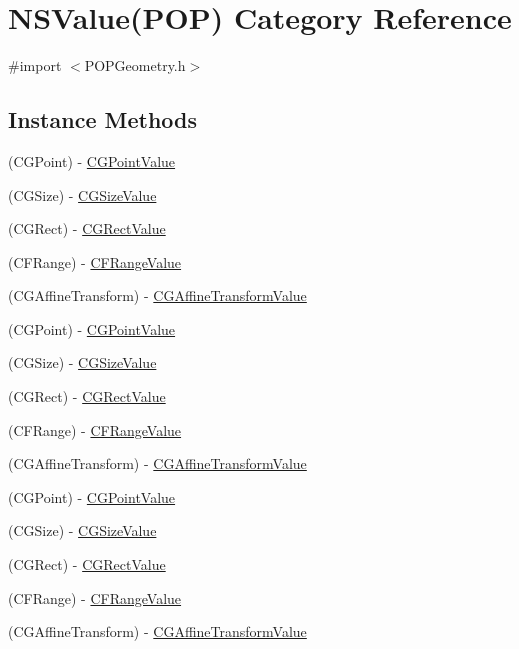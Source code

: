 \hypertarget{category_n_s_value_07_p_o_p_08}{}\section{N\+S\+Value(P\+OP) Category Reference}
\label{category_n_s_value_07_p_o_p_08}


{\ttfamily \#import $<$P\+O\+P\+Geometry.\+h$>$}

\subsection*{Instance Methods}
\begin{DoxyCompactItemize}
\item 
(C\+G\+Point) -\/ \mbox{\hyperlink{category_n_s_value_07_p_o_p_08_a822d03e52b5732d4f1f1e113ee98eae1}{C\+G\+Point\+Value}}
\item 
(C\+G\+Size) -\/ \mbox{\hyperlink{category_n_s_value_07_p_o_p_08_a678091645c26109850353002c53ff237}{C\+G\+Size\+Value}}
\item 
(C\+G\+Rect) -\/ \mbox{\hyperlink{category_n_s_value_07_p_o_p_08_ac3ee6607c5c70dc19435de8f4d485c19}{C\+G\+Rect\+Value}}
\item 
(C\+F\+Range) -\/ \mbox{\hyperlink{category_n_s_value_07_p_o_p_08_a35d9c5e3300a1ffc03ce6e25614b7eca}{C\+F\+Range\+Value}}
\item 
(C\+G\+Affine\+Transform) -\/ \mbox{\hyperlink{category_n_s_value_07_p_o_p_08_a3b835034a3d727396a3c4742add5dc8b}{C\+G\+Affine\+Transform\+Value}}
\item 
(C\+G\+Point) -\/ \mbox{\hyperlink{category_n_s_value_07_p_o_p_08_a822d03e52b5732d4f1f1e113ee98eae1}{C\+G\+Point\+Value}}
\item 
(C\+G\+Size) -\/ \mbox{\hyperlink{category_n_s_value_07_p_o_p_08_a678091645c26109850353002c53ff237}{C\+G\+Size\+Value}}
\item 
(C\+G\+Rect) -\/ \mbox{\hyperlink{category_n_s_value_07_p_o_p_08_ac3ee6607c5c70dc19435de8f4d485c19}{C\+G\+Rect\+Value}}
\item 
(C\+F\+Range) -\/ \mbox{\hyperlink{category_n_s_value_07_p_o_p_08_a35d9c5e3300a1ffc03ce6e25614b7eca}{C\+F\+Range\+Value}}
\item 
(C\+G\+Affine\+Transform) -\/ \mbox{\hyperlink{category_n_s_value_07_p_o_p_08_a3b835034a3d727396a3c4742add5dc8b}{C\+G\+Affine\+Transform\+Value}}
\item 
(C\+G\+Point) -\/ \mbox{\hyperlink{category_n_s_value_07_p_o_p_08_a822d03e52b5732d4f1f1e113ee98eae1}{C\+G\+Point\+Value}}
\item 
(C\+G\+Size) -\/ \mbox{\hyperlink{category_n_s_value_07_p_o_p_08_a678091645c26109850353002c53ff237}{C\+G\+Size\+Value}}
\item 
(C\+G\+Rect) -\/ \mbox{\hyperlink{category_n_s_value_07_p_o_p_08_ac3ee6607c5c70dc19435de8f4d485c19}{C\+G\+Rect\+Value}}
\item 
(C\+F\+Range) -\/ \mbox{\hyperlink{category_n_s_value_07_p_o_p_08_a35d9c5e3300a1ffc03ce6e25614b7eca}{C\+F\+Range\+Value}}
\item 
(C\+G\+Affine\+Transform) -\/ \mbox{\hyperlink{category_n_s_value_07_p_o_p_08_a3b835034a3d727396a3c4742add5dc8b}{C\+G\+Affine\+Transform\+Value}}
\end{DoxyCompactItemize}
